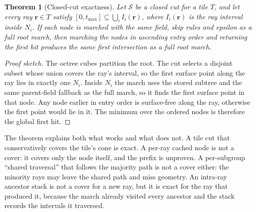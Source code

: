\documentclass[11pt,a4paper]{article}
\newcommand{\vect}[1]{\mathbf{#1}}
\theoremstyle{plain}
\newtheorem{theorem}{Theorem}
\theoremstyle{definition}
\theoremstyle{remark}
\begin{document}
\begin{theorem}[Closed-cut exactness]
\label{thm:cut}
Let $\mathcal{S}$ be a closed cut for a tile $T$, and let every ray
$\vect{r}\in T$ satisfy $[0,t_{\max}]\subseteq\bigcup_i I_i(\vect{r})$, where
$I_i(\vect{r})$ is the ray interval inside $N_i$. If each node is marched with
the same field, skip rules and epsilon as a full root march, then marching the
nodes in ascending entry order and returning the first hit produces the same
first intersection as a full root march.
\end{theorem}

\begin{proof}[Proof sketch]
The octree cubes partition the root. The cut selects a disjoint subset whose
union covers the ray's interval, so the first surface point along the ray lies
in exactly one $N_i$. Inside $N_i$ the march uses the stored subtree and the
same parent-field fallback as the full march, so it finds the first surface
point in that node. Any node earlier in entry order is surface-free along the
ray, otherwise the first point would lie in it. The minimum over the ordered
nodes is therefore the global first hit.
\end{proof}

The theorem explains both what works and what does not. A tile cut that
conservatively covers the tile's cone is exact. A per-ray cached node is not a
cover: it covers only the node itself, and the prefix is unproven. A
per-subgroup ``shared traversal'' that follows the majority path is not a
cover either: the minority rays may leave the shared path and miss geometry.
An intra-ray ancestor stack is not a cover for a new ray, but it is exact for
the ray that produced it, because the march already visited every ancestor and
the stack records the intervals it traversed.
\end{document}
